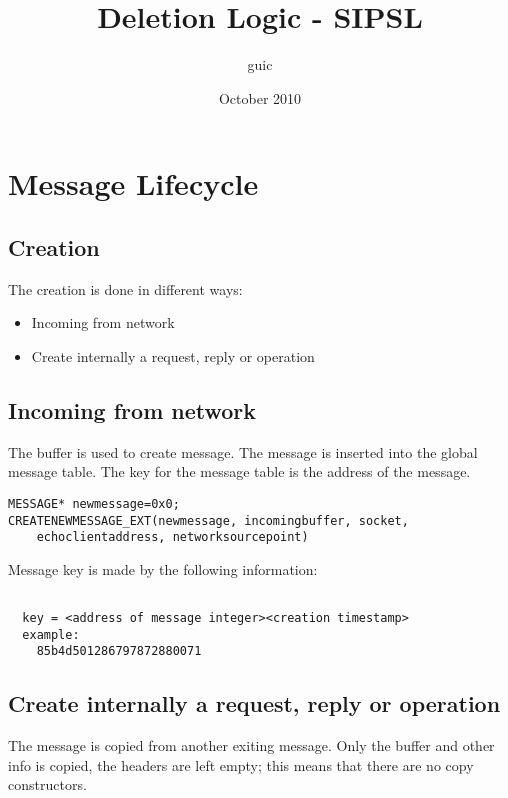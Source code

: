 \documentclass[a4paper]{article}
\title{Deletion Logic - SIPSL}
\author{guic}
\date{October 2010}
\begin{document}
	\small
	\maketitle
\section{Message Lifecycle}

\subsection{Creation}

The creation is done in different ways:

\begin{itemize}
   \item Incoming from network
   \item Create internally a request, reply or operation
\end{itemize}

\subsection{Incoming from network}

The buffer is used to create message. The message is inserted into the global message table. 
The key for the message table is the address of the message.

\begin{verbatim}
MESSAGE* newmessage=0x0;
CREATENEWMESSAGE_EXT(newmessage, incomingbuffer, socket,
    echoclientaddress, networksourcepoint)
\end{verbatim}

Message key is made by the following information:
\begin{verbatim}

  key = <address of message integer><creation timestamp>
  example:
    85b4d501286797872880071

\end{verbatim}
	
\subsection{Create internally a request, reply or operation}
	
The message is copied from another exiting message. Only the buffer and other info is copied, the headers are left empty; this means that there are no copy constructors.	
	
\end{document}

